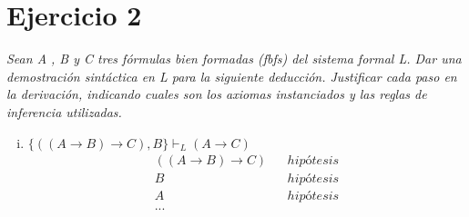 \documentclass[osajnl,twocolumn,showpacs,superscriptaddress,10pt,leqno]{revtex4-1} %
\begin{document}
\section{Ejercicio 2}

\textit{Sean A , B y C tres fórmulas bien formadas (fbfs) del sistema formal L. Dar una demostración sintáctica en L para la siguiente deducción. Justificar cada paso en la derivación, indicando cuales son los axiomas instanciados y las reglas de inferencia utilizadas.}

\begin{enumerate}[i.]
    \item $\{((A \rightarrow B) \rightarrow C), B\} \vdash_L (A \rightarrow C)$ \\

    \begin{align}
        ((A \rightarrow B) \rightarrow C) && hipótesis \\
        B && hipótesis \\
        A && hipótesis \\
        ...
    \end{align}
\end{enumerate}
\end{document}
